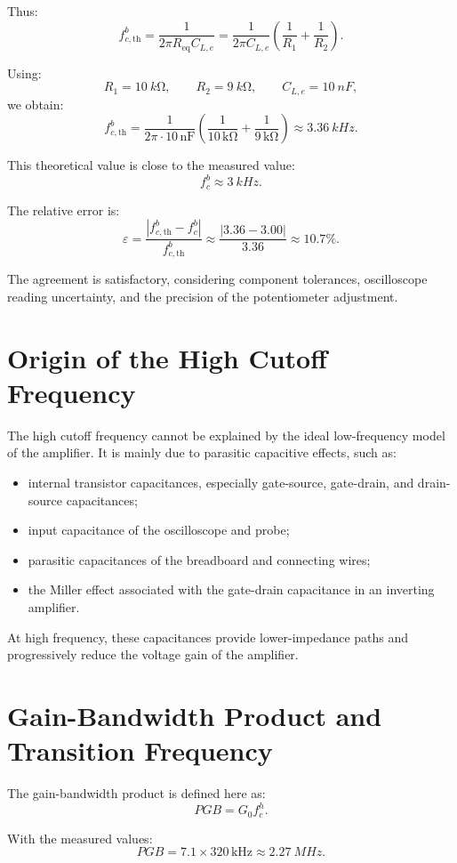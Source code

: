 \documentclass[11pt,a4paper]{article}
\begin{document}
Thus:
\[
f_{c,\mathrm{th}}^b
=\frac{1}{2\pi R_{\mathrm{eq}}C_{L,e}}
=\frac{1}{2\pi C_{L,e}}
\left(
\frac{1}{R_1}+\frac{1}{R_2}
\right).
\]

Using:
\[
R_1=\SI{10}{k\ohm}, \qquad R_2=\SI{9}{k\ohm}, \qquad C_{L,e}=\SI{10}{nF},
\]
we obtain:
\[
f_{c,\mathrm{th}}^b
=\frac{1}{2\pi\cdot 10\,\mathrm{nF}}
\left(
\frac{1}{10\,\mathrm{k\Omega}}+
\frac{1}{9\,\mathrm{k\Omega}}
\right)
\approx \SI{3.36}{kHz}.
\]

This theoretical value is close to the measured value:
\[
f_c^b\approx \SI{3}{kHz}.
\]

The relative error is:
\[
\varepsilon
=\frac{|f_{c,\mathrm{th}}^b-f_c^b|}{f_{c,\mathrm{th}}^b}
\approx
\frac{|3.36-3.00|}{3.36}
\approx 10.7\%.
\]

The agreement is satisfactory, considering component tolerances, oscilloscope reading uncertainty, and the precision of the potentiometer adjustment.

\section{Origin of the High Cutoff Frequency}

The high cutoff frequency cannot be explained by the ideal low-frequency model of the amplifier. It is mainly due to parasitic capacitive effects, such as:
\begin{itemize}
  \item internal transistor capacitances, especially gate-source, gate-drain, and drain-source capacitances;
  \item input capacitance of the oscilloscope and probe;
  \item parasitic capacitances of the breadboard and connecting wires;
  \item the Miller effect associated with the gate-drain capacitance in an inverting amplifier.
\end{itemize}

At high frequency, these capacitances provide lower-impedance paths and progressively reduce the voltage gain of the amplifier.

\section{Gain-Bandwidth Product and Transition Frequency}

The gain-bandwidth product is defined here as:
\[
PGB=G_0 f_c^h.
\]

With the measured values:
\[
PGB=7.1\times 320\,\mathrm{kHz}
\approx \SI{2.27}{MHz}.
\]
\end{document}
